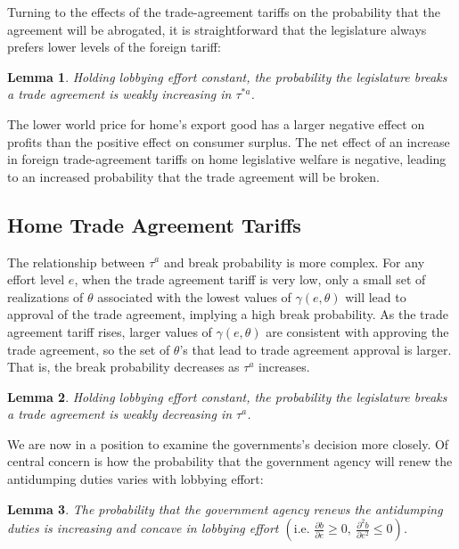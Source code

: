 \documentclass[10pt]{article}
\newtheorem{lemma}{Lemma}
\newcommand{\ta}{\theta}
\newcommand{\ga}{\gamma}
\begin{document}
Turning to the effects of the trade-agreement tariffs on the probability that the agreement will be abrogated, it is straightforward that the legislature always prefers lower levels of the foreign tariff:
\begin{lemma}
  Holding lobbying effort constant, the probability the legislature breaks a trade agreement is weakly increasing in $\tau^{*a}$.
  \label{lem:leg_astar}
\end{lemma}

The lower world price for home's export good has a larger negative effect on profits than the positive effect on consumer surplus. The net effect of an increase in foreign trade-agreement tariffs on home legislative welfare is negative, leading to an increased probability that the trade agreement will be broken.


\bigskip
\subsection{Home Trade Agreement Tariffs}
\label{sec:home}

The relationship between $\tau^a$ and break probability is more complex. For any effort level $e$, when the trade agreement tariff is very low, only a small set of realizations of $\ta$ associated with the lowest values of $\ga(e,\ta)$ will lead to approval of the trade agreement, implying a high break probability. As the trade agreement tariff rises, larger values of $\ga(e,\ta)$ are consistent with approving the trade agreement, so the set of $\ta$'s that lead to trade agreement approval is larger. That is, the break probability decreases as $\tau^a$ increases. 

\begin{lemma}
  Holding lobbying effort constant, the probability the legislature breaks a trade agreement is weakly decreasing in $\tau^a$.
  \label{res:leg_a}
\end{lemma}


We are now in a position to examine the governments's decision more closely. Of central concern is how the probability that the government agency will renew the antidumping duties varies with lobbying effort: 

\begin{lemma}
  The probability that the government agency renews the antidumping duties is increasing and concave in lobbying effort $\left(\text{i.e. } \frac{\partial b}{\partial e} \geq 0, \ \frac{\partial^2 b}{\partial e^2} \leq 0  \right)$.
  \label{res:bincC}
\end{lemma}
\end{document}

